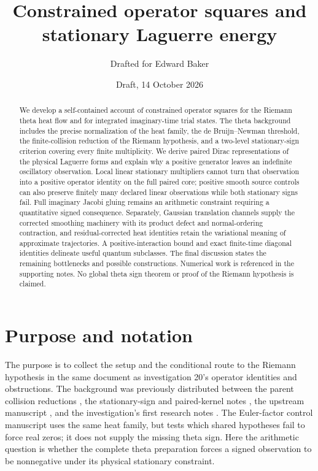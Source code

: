 \documentclass[11pt]{article}
\title{Constrained operator squares and stationary Laguerre energy}
\author{Drafted for Edward Baker}
\date{Draft, 14 October 2026}
\numberwithin{equation}{section}
\theoremstyle{definition}
\theoremstyle{remark}
\begin{document}
\maketitle
\begin{abstract}
We develop a self-contained account of constrained operator squares for the
Riemann theta heat flow and for integrated imaginary-time trial states.
The theta background includes the precise normalization of the heat family,
the de Bruijn--Newman threshold, the finite-collision reduction of the
Riemann hypothesis, and a two-level stationary-sign criterion covering
every finite multiplicity. We derive paired Dirac representations of the
physical Laguerre forms and explain why a positive generator leaves an
indefinite oscillatory observation. Local linear stationary multipliers
cannot turn that observation into a positive operator identity on the full
paired core; positive smooth source controls can also preserve finitely
many declared linear observations while both stationary signs fail.
Full imaginary Jacobi gluing remains an arithmetic constraint requiring a
quantitative signed consequence. Separately, Gaussian translation channels
supply the corrected smoothing machinery with its product defect and
normal-ordering contraction, and residual-corrected heat identities retain
the variational meaning of approximate trajectories. A positive-interaction
bound and exact finite-time diagonal identities delineate useful quantum
subclasses. The final discussion states the remaining bottlenecks and
possible constructions. Numerical work is referenced in the supporting
notes. No global theta sign theorem or proof of the Riemann hypothesis is
claimed.
\end{abstract}
\tableofcontents

\section{Purpose and notation}\label{sec:purpose}
The purpose is to collect the setup and the conditional route to the
Riemann hypothesis in the same document as investigation 20's operator
identities and obstructions. The background was previously distributed
between the parent collision reductions \cite{parentcollision}, the
stationary-sign and paired-kernel notes \cite{stationarynote,kernelnote},
the upstream manuscript \cite{upstreamtransport}, and the investigation's first research notes
\cite{diracnote,residualnote,localobstruction,smoothingnote}.
The Euler-factor control manuscript \cite{eulercontrols} uses the same
heat family, but tests which shared hypotheses fail to force real zeros;
it does not supply the missing theta sign. Here the arithmetic question
is whether the complete theta preparation forces a signed observation to
be nonnegative under its physical stationary constraint.
\end{document}

